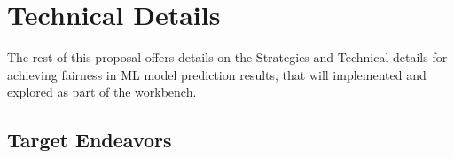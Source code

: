  







\section{ Technical Details}\label{tion:details}



The rest of this proposal offers details  on the Strategies and Technical details for achieving fairness in ML model prediction results, that will implemented and explored as part
of the {\IT} workbench. 

\subsection{Target Endeavors}\label{tion:ende}

